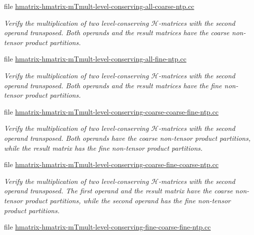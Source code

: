 \begin{DoxyCompactItemize}
file \hyperlink{hmatrix-hmatrix-mTmult-level-conserving-all-coarse-ntp_8cc}{hmatrix-\/hmatrix-\/m\+Tmult-\/level-\/conserving-\/all-\/coarse-\/ntp.\+cc}
\begin{DoxyCompactList}\small\item\em Verify the multiplication of two level-\/conserving $\mathcal{H}$-\/matrices with the second operand transposed. Both operands and the result matrices have the coarse non-\/tensor product partitions. \end{DoxyCompactList}\item 
file \hyperlink{hmatrix-hmatrix-mTmult-level-conserving-all-fine-ntp_8cc}{hmatrix-\/hmatrix-\/m\+Tmult-\/level-\/conserving-\/all-\/fine-\/ntp.\+cc}
\begin{DoxyCompactList}\small\item\em Verify the multiplication of two level-\/conserving $\mathcal{H}$-\/matrices with the second operand transposed. Both operands and the result matrices have the fine non-\/tensor product partitions. \end{DoxyCompactList}\item 
file \hyperlink{hmatrix-hmatrix-mTmult-level-conserving-coarse-coarse-fine-ntp_8cc}{hmatrix-\/hmatrix-\/m\+Tmult-\/level-\/conserving-\/coarse-\/coarse-\/fine-\/ntp.\+cc}
\begin{DoxyCompactList}\small\item\em Verify the multiplication of two level-\/conserving $\mathcal{H}$-\/matrices with the second operand transposed. Both operands have the coarse non-\/tensor product partitions, while the result matrix has the fine non-\/tensor product partitions. \end{DoxyCompactList}\item 
file \hyperlink{hmatrix-hmatrix-mTmult-level-conserving-coarse-fine-coarse-ntp_8cc}{hmatrix-\/hmatrix-\/m\+Tmult-\/level-\/conserving-\/coarse-\/fine-\/coarse-\/ntp.\+cc}
\begin{DoxyCompactList}\small\item\em Verify the multiplication of two level-\/conserving $\mathcal{H}$-\/matrices with the second operand transposed. The first operand and the result matrix have the coarse non-\/tensor product partitions, while the second operand has the fine non-\/tensor product partitions. \end{DoxyCompactList}\item 
file \hyperlink{hmatrix-hmatrix-mTmult-level-conserving-fine-coarse-fine-ntp_8cc}{hmatrix-\/hmatrix-\/m\+Tmult-\/level-\/conserving-\/fine-\/coarse-\/fine-\/ntp.\+cc}

\end{DoxyCompactItemize}
